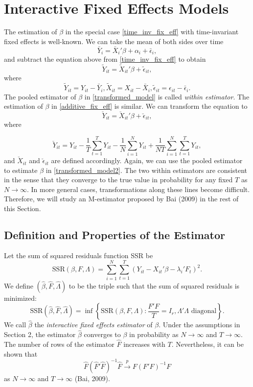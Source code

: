 \documentclass[a4paper]{article}
\begin{document}
\section{Interactive Fixed Effects Models}

The estimation of $\beta$ in the special case \eqref{time_inv_fix_eff} with time-invariant fixed effects is well-known. We can take the mean of both sides over time
\[
	\bar Y_i=\bar X_i'\beta+\alpha_i+\bar\epsilon_i,
\]
and subtract the equation above from \eqref{time_inv_fix_eff} to obtain
\begin{equation}\label{transformed_model}
	\tilde Y_{it}=\tilde X_{it}'\beta+\tilde \epsilon_{it},
\end{equation}
where
\[
	\tilde Y_{it}=Y_{it}-\bar Y_i,\tilde X_{it}=X_{it}-\bar X_i,\tilde \epsilon_{it}=\epsilon_{it}-\bar \epsilon_i.
\]
The pooled estimator of $\beta$ in \eqref{transformed_model} is called \textit{within estimator}. The estimation of $\beta$ in \eqref{additive_fix_eff} is similar. We can transform the equation to
\begin{equation}\label{transformed_model2}
	\breve Y_{it}=\breve X_{it}'\beta+\breve \epsilon_{it},
\end{equation}
where

\[
	\breve Y_{it}=Y_{it}-\frac{1}{T}\sum_{t=1}^{T}Y_{it}-\frac{1}{N}\sum_{i=1}^{N}Y_{it}+\frac{1}{NT}\sum_{i=1}^N\sum_{t=1}^T Y_{it},
\]
and $\breve X_{it}$ and $\breve \epsilon_{it}$ are defined accordingly. Again, we can use the pooled estimator to estimate $\beta$ in \eqref{transformed_model2}. The two within estimators are consistent in the sense that they converge to the true value in probability for any fixed $T$ as $N \to \infty$. In more general cases, transformations along these lines become difficult. Therefore, we will study an M-estimator proposed by Bai (2009) in the rest of this Section.






\subsection{Definition and Properties of the Estimator}


Let the sum of squared residuals function SSR be
\[
\text{SSR}(\beta,  F, \Lambda)=\sum_{i=1}^{N}\sum_{t=1}^{T}\left(Y_{it}-X_{it}' \beta- \lambda_i' F_t\right)^2.
\]
We define $(\hat \beta, \hat F, \hat \Lambda)$ to be the triple such that the sum of squared residuals is minimized:
\begin{equation}\label{def_of_estimator}
	\text{SSR}(\hat \beta, \hat F, \hat \Lambda)=\inf\left\{\text{SSR}(\beta, F, \Lambda): \frac{F'F}{T}=I_r, \Lambda'\Lambda \text{  diagonal}\right\}.
\end{equation}
We call $\hat \beta$ the \textit{interactive fixed effects estimator} of $\beta$. Under the assumptions in Section 2, the estimator $\hat \beta$ converges to $\beta$ in probability as $N \to \infty$ and $T \to \infty$. The number of rows of the estimator $\hat F$ increases with $T$. Nevertheless, it can be shown that
\[
    \hat F(\hat F'\hat F)^{-1}\hat F \overset{p}{\to} F(F'F)^{-1}F
\]
as $N \to \infty$ and $T \to \infty$ (Bai, 2009).
\end{document}
